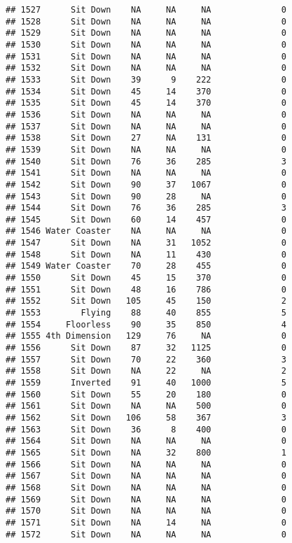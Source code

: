 \documentclass[
]{article}
\begin{document}
\begin{verbatim}
## 1527      Sit Down    NA     NA     NA              0
## 1528      Sit Down    NA     NA     NA              0
## 1529      Sit Down    NA     NA     NA              0
## 1530      Sit Down    NA     NA     NA              0
## 1531      Sit Down    NA     NA     NA              0
## 1532      Sit Down    NA     NA     NA              0
## 1533      Sit Down    39      9    222              0
## 1534      Sit Down    45     14    370              0
## 1535      Sit Down    45     14    370              0
## 1536      Sit Down    NA     NA     NA              0
## 1537      Sit Down    NA     NA     NA              0
## 1538      Sit Down    27     NA    131              0
## 1539      Sit Down    NA     NA     NA              0
## 1540      Sit Down    76     36    285              3
## 1541      Sit Down    NA     NA     NA              0
## 1542      Sit Down    90     37   1067              0
## 1543      Sit Down    90     28     NA              0
## 1544      Sit Down    76     36    285              3
## 1545      Sit Down    60     14    457              0
## 1546 Water Coaster    NA     NA     NA              0
## 1547      Sit Down    NA     31   1052              0
## 1548      Sit Down    NA     11    430              0
## 1549 Water Coaster    70     28    455              0
## 1550      Sit Down    45     15    370              0
## 1551      Sit Down    48     16    786              0
## 1552      Sit Down   105     45    150              2
## 1553        Flying    88     40    855              5
## 1554     Floorless    90     35    850              4
## 1555 4th Dimension   129     76     NA              0
## 1556      Sit Down    87     32   1125              0
## 1557      Sit Down    70     22    360              3
## 1558      Sit Down    NA     22     NA              2
## 1559      Inverted    91     40   1000              5
## 1560      Sit Down    55     20    180              0
## 1561      Sit Down    NA     NA    500              0
## 1562      Sit Down   106     58    367              3
## 1563      Sit Down    36      8    400              0
## 1564      Sit Down    NA     NA     NA              0
## 1565      Sit Down    NA     32    800              1
## 1566      Sit Down    NA     NA     NA              0
## 1567      Sit Down    NA     NA     NA              0
## 1568      Sit Down    NA     NA     NA              0
## 1569      Sit Down    NA     NA     NA              0
## 1570      Sit Down    NA     NA     NA              0
## 1571      Sit Down    NA     14     NA              0
## 1572      Sit Down    NA     NA     NA              0

\end{verbatim}
\end{document}
